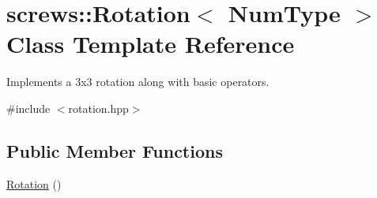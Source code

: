 \hypertarget{singletonscrews_1_1_rotation}{\section{screws\+:\+:Rotation$<$ Num\+Type $>$ Class Template Reference}
\label{singletonscrews_1_1_rotation}
}


Implements a 3x3 rotation along with basic operators.  




{\ttfamily \#include $<$rotation.\+hpp$>$}

\subsection*{Public Member Functions}
\begin{DoxyCompactItemize}
\item 
\hypertarget{singletonscrews_1_1_rotation_a6e84b8c6ff433fb45a4549df8e8e38c6}{\hyperlink{singletonscrews_1_1_rotation_a6e84b8c6ff433fb45a4549df8e8e38c6}{Rotation} ()}\label{singletonscrews_1_1_rotation_a6e84b8c6ff433fb45a4549df8e8e38c6}


\end{DoxyCompactItemize}
